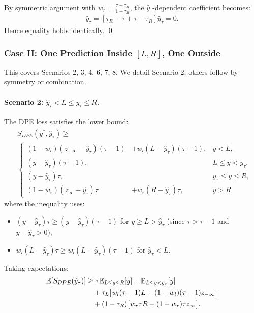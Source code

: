\documentclass[sigconf]{acmart}
\begin{document}
By symmetric argument with $w_r = \frac{\tau-\tau_R}{1-\tau_R}$, the $\hat{y}_\tau$-dependent coefficient becomes:
\begin{align*}
[\tau_R - \tau + w_r(1-\tau_R)]\hat{y}_\tau = [\tau_R - \tau + \tau - \tau_R]\hat{y}_\tau = 0.
\end{align*}
Hence equality holds identically.  \qed

\subsubsection[Case II: One Prediction Inside {[L,R]}, One Outside]
{Case II: One Prediction Inside $[{L,R}]$, One Outside}

This covers Scenarios 2, 3, 4, 6, 7, 8. We detail Scenario 2; others follow by symmetry or combination.

\paragraph{Scenario 2: $\hat{y}_\tau < L \le y_\tau \le R$.}

The DPE loss satisfies the lower bound:
\begin{align*}
&S_{DPE}(y^*, \hat{y}_\tau) \ge \\
& \left\{
\begin{aligned}
(1-w_l)(z_{-\infty}-\hat{y}_\tau)(\tau-1) &+ w_l(L-\hat{y}_\tau)(\tau-1), & y < L, \\
(y-\hat{y}_\tau)(\tau-1), & & L \le y < y_\tau, \\
(y-\hat{y}_\tau)\tau, & & y_\tau \le y \le R, \\
(1-w_r)(z_{\infty}-\hat{y}_\tau)\tau &+ w_r(R-\hat{y}_\tau)\tau, & y > R
\end{aligned}
\right.
\end{align*}
where the inequality uses:
\begin{itemize}
    \item $(y-\hat{y}_\tau)\tau \ge (y-\hat{y}_\tau)(\tau-1)$ for $y \ge L > \hat{y}_\tau$ (since $\tau > \tau-1$ and $y-\hat{y}_\tau > 0$);
    \item $w_l(L-\hat{y}_\tau)\tau \ge w_l(L-\hat{y}_\tau)(\tau-1)$ for $\hat{y}_\tau < L$.
\end{itemize}

Taking expectations:
\begin{align}
\mathbb{E}[S_{DPE}(\hat{y}_\tau)] &\ge \tau\mathbb{E}_{L\le y\le R}[y] - \mathbb{E}_{L\le y<y_\tau}[y] \notag\\
&\quad + \tau_L\bigl[w_l(\tau-1)L + (1-w_l)(\tau-1)z_{-\infty}\bigr] \notag\\
&\quad + (1-\tau_R)\bigl[w_r\tau R + (1-w_r)\tau z_{\infty}\bigr]. \label{eq:scen2_lb}
\end{align}
\end{document}
